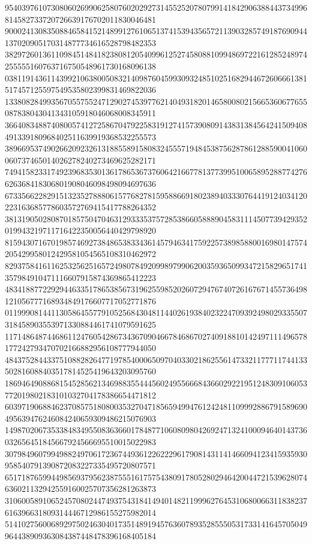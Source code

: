 \begin{DoxyCode}
      954039761073080602699062580760202927314552520780799141842906388443734996814582733720726639176702011830046481
      900024130835088465841521489912761065137415394356572113903285749187690944137020905170314877734616528798482353
      382972601361109845148418238081205409961252745808810994869722161285248974255555160763716750548961730168096138
      038119143611439921063800508321409876045993093248510251682944672606661381517457125597549535802399831469822036
      133808284993567055755247129027453977621404931820146580080215665360677655087838043041343105918046068008345911
      366408348874080057412725867047922583191274157390809143831384564241509408491339180968402511639919368532255573
      389669537490266209232613188558915808324555719484538756287861288590041060060737465014026278240273469625282171
      749415823317492396835301361786536737606421667781377399510065895288774276626368418306801908046098498094697636
      673356622829151323527888061577682781595886691802389403330764419124034120223163685778603572769415417788264352
      381319050280870185750470463129333537572853866058889045831114507739429352019943219711716422350056440429798920
      815943071670198574692738486538334361457946341759225738985880016980147574205429958012429581054565108310462972
      829375841611625325625165724980784920998979906200359365099347215829651741357984910471116607915874369865412223
      483418877229294463351786538567319625598520260729476740726167671455736498121056777168934849176607717052771876
      011999081441130586455779105256843048114402619384023224709392498029335507318458903553971330884461741079591625
      117148648744686112476054286734367090466784686702740918810142497111496578177242793470702166882956108777944050
      484375284433751088282647719785400065097040330218625561473321177711744133502816088403517814525419643203095760
      186946490886815452856213469883554445602495566684366029221951248309106053772019802183101032704178386654471812
      603971906884623708575180800353270471856594994761242481109992886791589690495639476246084240659309486215076903
      149870206735338483495508363660178487710608098042692471324100094640143736032656451845667924566695510015022983
      307984960799498824970617236744936122622296179081431141466094123415935930958540791390872083227335495720807571
      651718765994498569379562387555161757543809178052802946420044721539628074636021132942559160025707356281263873
      310600589106524570802447493754318414940148211999627645310680066311838237616396631809314446712986155275982014
      514102756006892975024630401735148919457636078935285550531733141645705049964438909363084387448478396168405184

\end{DoxyCode}

